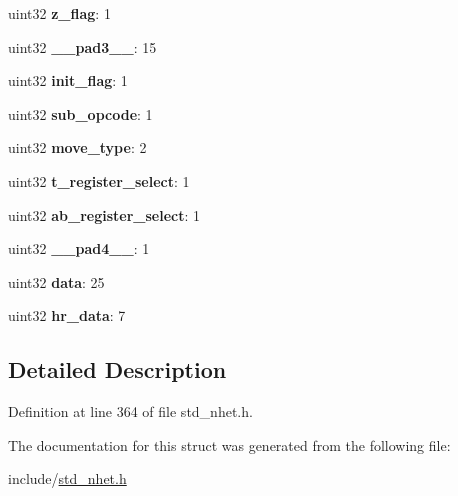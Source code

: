 \begin{DoxyCompactItemize}
uint32 {\bfseries z\+\_\+flag}\+: 1
\item 
\mbox{\label{structMOV32__format_a1cd840ca25b036b41030a1ea2c9777bf}} 
uint32 {\bfseries \+\_\+\+\_\+pad3\+\_\+\+\_\+}\+: 15
\item 
\mbox{\label{structMOV32__format_ad3cd4603520ca6038e3012195a1d2ead}} 
uint32 {\bfseries init\+\_\+flag}\+: 1
\item 
\mbox{\label{structMOV32__format_a9be38e8fbd18e906968e7172533efe08}} 
uint32 {\bfseries sub\+\_\+opcode}\+: 1
\item 
\mbox{\label{structMOV32__format_a4a102537775fe95e5553f2adfef985a6}} 
uint32 {\bfseries move\+\_\+type}\+: 2
\item 
\mbox{\label{structMOV32__format_a3a514ecf34d6817f0422900a469aeb00}} 
uint32 {\bfseries t\+\_\+register\+\_\+select}\+: 1
\item 
\mbox{\label{structMOV32__format_a34de467f31312bc1717022b8dd962619}} 
uint32 {\bfseries ab\+\_\+register\+\_\+select}\+: 1
\item 
\mbox{\label{structMOV32__format_af2acfaf500eaae4c6dbdc16aa9faf716}} 
uint32 {\bfseries \+\_\+\+\_\+pad4\+\_\+\+\_\+}\+: 1
\item 
\mbox{\label{structMOV32__format_ab1429323e05eb5de9041ec57df35f85d}} 
uint32 {\bfseries data}\+: 25
\item 
\mbox{\label{structMOV32__format_abd2b359548be92521f0f6f937edeb9b7}} 
uint32 {\bfseries hr\+\_\+data}\+: 7
\end{DoxyCompactItemize}


\subsection{Detailed Description}


Definition at line 364 of file std\+\_\+nhet.\+h.



The documentation for this struct was generated from the following file\+:\begin{DoxyCompactItemize}
\item 
include/\mbox{\hyperlink{std__nhet_8h}{std\+\_\+nhet.\+h}}\end{DoxyCompactItemize}
